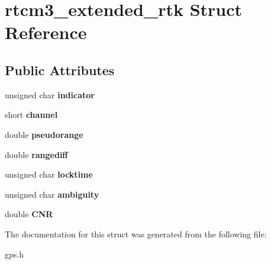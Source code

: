 \hypertarget{structrtcm3__extended__rtk}{\section{rtcm3\-\_\-extended\-\_\-rtk \-Struct \-Reference}
\label{structrtcm3__extended__rtk}
}
\subsection*{\-Public \-Attributes}
\begin{DoxyCompactItemize}
\item 
\hypertarget{structrtcm3__extended__rtk_a3e60081e1b26da13ed2f7a9a44e592c0}{unsigned char {\bfseries indicator}}\label{structrtcm3__extended__rtk_a3e60081e1b26da13ed2f7a9a44e592c0}

\item 
\hypertarget{structrtcm3__extended__rtk_ac1682a0d797890f5a4fd2434354bad3b}{short {\bfseries channel}}\label{structrtcm3__extended__rtk_ac1682a0d797890f5a4fd2434354bad3b}

\item 
\hypertarget{structrtcm3__extended__rtk_a8adf0e9ab663612e66859d67c08693e8}{double {\bfseries pseudorange}}\label{structrtcm3__extended__rtk_a8adf0e9ab663612e66859d67c08693e8}

\item 
\hypertarget{structrtcm3__extended__rtk_adca872f29f018ba7289bbf783585467f}{double {\bfseries rangediff}}\label{structrtcm3__extended__rtk_adca872f29f018ba7289bbf783585467f}

\item 
\hypertarget{structrtcm3__extended__rtk_a25f9cbc81274a9b99156d2c35934ca20}{unsigned char {\bfseries locktime}}\label{structrtcm3__extended__rtk_a25f9cbc81274a9b99156d2c35934ca20}

\item 
\hypertarget{structrtcm3__extended__rtk_a1cdfdd9c6d11f5abe984fb145e52110b}{unsigned char {\bfseries ambiguity}}\label{structrtcm3__extended__rtk_a1cdfdd9c6d11f5abe984fb145e52110b}

\item 
\hypertarget{structrtcm3__extended__rtk_aee122dd8f05ebcbf46b9b18031cb0c8c}{double {\bfseries \-C\-N\-R}}\label{structrtcm3__extended__rtk_aee122dd8f05ebcbf46b9b18031cb0c8c}

\end{DoxyCompactItemize}


\-The documentation for this struct was generated from the following file\-:\begin{DoxyCompactItemize}
\item 
gps.\-h\end{DoxyCompactItemize}
